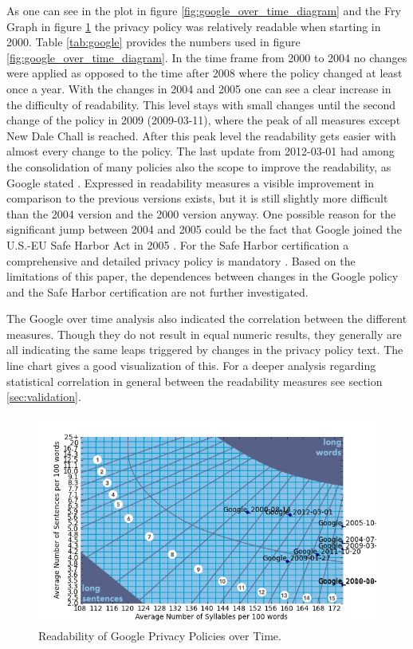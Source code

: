 \documentclass[runningheads,a4paper]{llncs}
\begin{document}
As one can see in the plot in figure \ref{fig:google_over_time_diagram} and the Fry Graph in figure \ref{fig:google_over_time} the privacy policy was relatively readable when starting in 2000. Table \ref{tab:google} provides the numbers used in figure \ref{fig:google_over_time_diagram}. In the time frame from 2000 to 2004 no changes were applied as opposed to the time after 2008 where the policy changed at least once a year. With the changes in 2004 and 2005 one can see a clear increase in the difficulty of readability. This level stays with small changes until the second change of the policy in 2009 (2009-03-11), where the peak of all measures except New Dale Chall is reached. After this peak level the readability gets easier with almost every change to the policy. 
The last update from 2012-03-01 had among the consolidation of many policies also the scope to improve the readability, as Google stated \cite{Google2012}. Expressed in readability measures a visible improvement in comparison to the previous versions exists, but it is still slightly more difficult than the 2004 version and the 2000 version anyway.
One possible reason for the significant jump between 2004 and 2005 could be the fact that Google joined the U.S.-EU Safe Harbor Act in 2005 \cite{safeharbor}. For the Safe Harbor certification a comprehensive and detailed privacy policy is mandatory \cite{safeharbor2}. Based on the limitations of this paper, the dependences between changes in the Google policy and the Safe Harbor certification are not further investigated.

The Google over time analysis also indicated the correlation between the different measures. Though they do not result in equal numeric results, they generally are all indicating the same leaps triggered by changes in the privacy policy text. The line chart gives a good visualization of this. For a deeper analysis regarding statistical correlation in general between the readability measures see section \ref{sec:validation}.

\begin{figure}
\centering
\includegraphics[width=\textwidth]{Bilder/google_over_time.png}
\caption{Readability of Google Privacy Policies over Time.}
\label{fig:google_over_time}
\end{figure}
\end{document}
